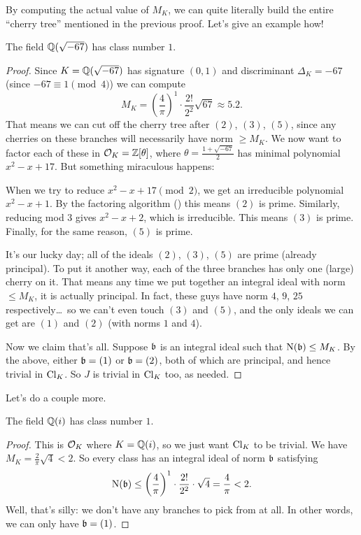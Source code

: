 By computing the actual value of $M_K$,
we can quite literally build the entire ``cherry tree'' mentioned in the previous proof.
Let's give an example how!
\begin{proposition}
	The field $\mathbb Q(\sqrt{-67})$ has class number $1$.
\end{proposition}
\begin{proof}
	Since $K = \mathbb Q(\sqrt{-67})$ has signature $(0,1)$
	and discriminant $\Delta_K = -67$ (since $-67 \equiv 1 \pmod 4$)
	we can compute
	\[ M_K = \left( \frac 4\pi \right)^{1} \cdot \frac{2!}{2^2} \sqrt{67} \approx 5.2. \]
	That means we can cut off the cherry tree after $(2)$, $(3)$, $(5)$, since any
	cherries on these branches will necessarily have norm $\ge M_K$.
	We now want to factor each of these in $\mathcal O_K = \mathbb Z[\theta]$, where $\theta = \frac{1+\sqrt{-67}}{2}$
	has minimal polynomial $x^2 - x + 17$.
	But something miraculous happens:
	\begin{itemize}
		\ii When we try to reduce $x^2-x+17 \pmod 2$, we get an irreducible polynomial $x^2-x+1$.
		By the factoring algorithm () this means $(2)$ is prime.
		\ii Similarly, reducing mod $3$ gives $x^2-x+2$, which is irreducible.
		This means $(3)$ is prime.
		\ii Finally, for the same reason, $(5)$ is prime.
	\end{itemize}
	It's our lucky day;
	all of the ideals $(2)$, $(3)$, $(5)$ are prime (already principal).
	To put it another way,
	each of the three branches has only one (large) cherry on it.
	That means any time we put together an integral ideal with norm $\le M_K$,
	it is actually principal.
	In fact, these guys have norm $4$, $9$, $25$ respectively\dots\
	so we can't even touch $(3)$ and $(5)$,
	and the only ideals we can get are $(1)$ and $(2)$ (with norms $1$ and $4$).

	Now we claim that's all.
	Suppose $\mathfrak b$ is an integral ideal such that $\operatorname{N}(\mathfrak b) \le M_K$.
	By the above, either $\mathfrak b = (1)$ or $\mathfrak b = (2)$, both of which are principal,
	and hence trivial in $\mathrm{Cl}_K$.
	So $J$ is trivial in $\mathrm{Cl}_K$ too, as needed.
\end{proof}
Let's do a couple more.
\begin{theorem}
	The field $\mathbb Q(i)$ has class number $1$.
\end{theorem}
\begin{proof}
	This is $\mathcal O_K$ where $K = \mathbb Q(i)$, so we just want $\mathrm{Cl}_K$ to be trivial.
	We have $M_K = \frac{2}{\pi}\sqrt{4} < 2$.
	So every class
	has an integral ideal of norm $\mathfrak b$ satisfying
	\[
		\operatorname{N}(\mathfrak b)
		\le \left( \frac4\pi \right)^{1} \cdot \frac{2!}{2^2} \cdot \sqrt{4}
		= \frac4\pi < 2.
	\]
	Well, that's silly: we don't have any branches to pick from at all.
	In other words, we can only have $\mathfrak b = (1)$.
\end{proof}

